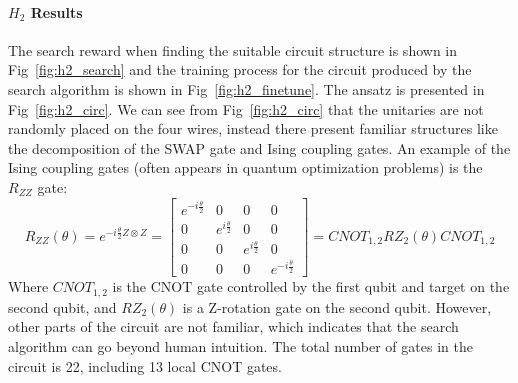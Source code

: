 \documentclass[a4paper,onecolumn,11pt]{quantumarticle}
\begin{document}
\paragraph{$H_2$ Results} The search reward when finding the suitable circuit structure is shown in Fig~\ref{fig:h2_search} and the training process for the circuit produced by the search algorithm is shown in Fig~\ref{fig:h2_finetune}. The ansatz is presented in Fig~\ref{fig:h2_circ}. We can see from Fig~\ref{fig:h2_circ} that the unitaries are not randomly placed on the four wires, instead there present familiar structures like the decomposition of the SWAP gate and Ising coupling gates. An example of the Ising coupling gates (often appears in quantum optimization problems) is the $R_{ZZ}$ gate:
\begin{equation}
R_{Z Z}(\theta)=e^{ -i \frac{\theta}{2} Z \otimes Z}=\left[\begin{array}{cccc}
e^{-i \frac{\theta}{2}} & 0 & 0 & 0 \\
0 & e^{i \frac{\theta}{2}} & 0 & 0 \\
0 & 0 & e^{i \frac{\theta}{2}} & 0 \\
0 & 0 & 0 & e^{-i \frac{\theta}{2}}
\end{array}\right] = CNOT_{1,2}RZ_{2}(\theta)CNOT_{1,2}
\end{equation}
Where $CNOT_{1,2}$ is the CNOT gate controlled by the first qubit and target on the second qubit, and $RZ_{2}(\theta)$ is a Z-rotation gate on the second qubit.
However, other parts of the circuit are not familiar, which indicates that the search algorithm can go beyond human intuition. The total number of gates in the circuit is 22, including 13 local CNOT gates.
\end{document}
